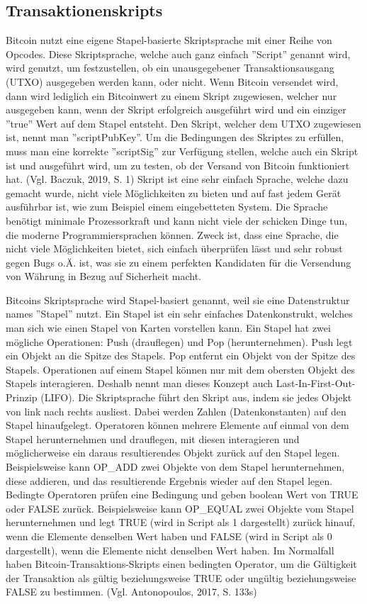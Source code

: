 \subsection{Transaktionenskripts}
Bitcoin nutzt eine eigene Stapel-basierte Skriptsprache mit einer Reihe von Opcodes. Diese Skriptsprache, welche auch ganz 
einfach ''Script'' genannt wird, wird genutzt, um festzustellen, ob ein unausgegebener Transaktionsausgang (UTXO) ausgegeben 
werden kann, oder nicht. Wenn Bitcoin versendet wird,
dann wird lediglich ein Bitcoinwert zu einem Skript zugewiesen, welcher nur ausgegeben kann, wenn der Skript erfolgreich
ausgeführt wird und ein einziger ''true'' Wert auf dem Stapel entsteht. Den Skript, welcher dem UTXO zugewiesen ist, nennt man
''scriptPubKey''. Um die Bedingungen des Skriptes zu erfüllen, muss man eine korrekte ''scriptSig'' zur Verfügung stellen,
welche auch ein Skript ist und ausgeführt wird, um zu testen, ob der Versand von Bitcoin funktioniert hat. (Vgl. Baczuk, 2019,
S. 1) Skript ist eine sehr einfach Sprache, welche dazu gemacht wurde, nicht viele Möglichkeiten zu bieten und auf fast jedem
Gerät ausführbar ist, wie zum Beispiel einem eingebetteten System. Die Sprache benötigt minimale Prozessorkraft und kann nicht 
viele der schicken Dinge tun, die moderne Programmiersprachen können. Zweck ist, dass eine Sprache, die nicht viele Möglichkeiten
bietet, sich einfach überprüfen lässt und sehr robust gegen Bugs o.Ä. ist, was sie zu einem perfekten Kandidaten für die 
Versendung von Währung in Bezug auf Sicherheit macht.

Bitcoins Skriptsprache wird Stapel-basiert genannt, weil sie eine Datenstruktur names ''Stapel'' nutzt. Ein Stapel ist ein sehr
einfaches Datenkonstrukt, welches man sich wie einen Stapel von Karten vorstellen kann. Ein Stapel hat zwei mögliche Operationen:
Push (drauflegen) und Pop (herunternehmen). Push legt ein Objekt an die Spitze des Stapels. Pop entfernt ein Objekt von der
Spitze des Stapels. Operationen auf einem Stapel können nur mit dem obersten Objekt des Stapels interagieren. Deshalb nennt man
dieses Konzept auch Last-In-First-Out-Prinzip (LIFO). Die Skriptsprache führt den Skript aus, indem sie jedes Objekt von link
nach rechts ausliest. Dabei werden Zahlen (Datenkonstanten) auf den Stapel hinaufgelegt. Operatoren können mehrere Elemente auf
einmal von dem Stapel herunternehmen und drauflegen, mit diesen interagieren und möglicherweise ein daraus resultierendes Objekt
zurück auf den Stapel legen. Beispielsweise kann OP\_ADD zwei Objekte von dem Stapel herunternehmen, diese addieren, und das
resultierende Ergebnis wieder auf den Stapel legen.
Bedingte Operatoren prüfen eine Bedingung und geben boolean Wert von TRUE oder FALSE zurück. Beispielsweise kann OP\_EQUAL zwei
Objekte vom Stapel herunternehmen und legt TRUE (wird in Script als 1 dargestellt) zurück hinauf, wenn die Elemente denselben
Wert haben und FALSE (wird in Script als 0 dargestellt), wenn die Elemente nicht denselben Wert haben. Im Normalfall haben
Bitcoin-Transaktions-Skripts einen bedingten Operator, um die Gültigkeit der Transaktion als gültig beziehungsweise TRUE oder
ungültig beziehungsweise FALSE zu bestimmen.  (Vgl. Antonopoulos, 2017, S. 133s)

